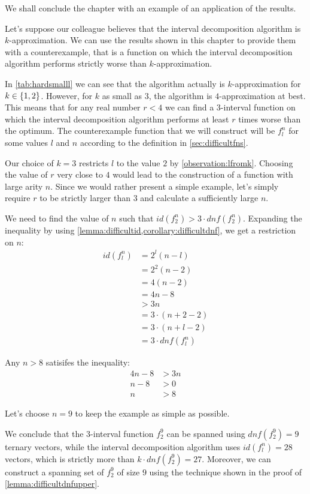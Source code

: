 We shall conclude the chapter with an example
of an application of the results.
\begin{example}
\label{example:approxidf24}
Let's
suppose our colleague believes
that the interval decomposition algorithm
is $k$-approximation.
We can use the results shown in this chapter
to provide them with a counterexample,
that is a function on which
the interval decomposition algorithm
performs strictly worse than $k$-approximation.

In \cref{tab:hardsmalll} we can see that the algorithm
actually is $k$-approximation for $k \in \{1, 2\}$.
However, for $k$ as small as $3$,
the algorithm is $4$-approximation at best.
This means that for any real number $r < 4$
we can find a $3$-interval function on which
the interval decomposition algorithm
performs at least $r$ times worse than the optimum.
The counterexample function that we will construct
will be $f_l^n$ for some values $l$ and $n$
according to the definition in \cref{sec:difficultfns}.

Our choice of $k=3$ restricts $l$ to the value $2$
by \cref{observation:lfromk}.
Choosing the value of $r$ very close to $4$
would lead to the construction of a function
with large arity $n$.
Since we would rather present a simple example,
let's
simply require $r$ to be strictly larger than $3$
and calculate a sufficiently large $n$.

We need to find the value of $n$ such that
$id(f_2^n) > 3 \cdot dnf(f_2^n)$.
Expanding the inequality by using
\cref{lemma:difficultid,corollary:difficultdnf},
we get a restriction on $n$:
\begin{align*}
id(f_l^n) &= 2^l(n-l) \\
&= 2^2(n-2) \\
&= 4 (n-2) \\
&= 4n - 8 \\
&> 3n \\
&= 3 \cdot (n+2-2) \\
&= 3 \cdot (n+l-2) \\
&= 3 \cdot \mathit{dnf}(f_l^n)
\end{align*}

Any $n > 8$ satisifes the inequality:
\begin{align*}
4n - 8 &> 3n \\
n - 8 &> 0 \\
n &> 8
\end{align*}

Let's choose $n=9$
to keep the example as simple as possible.

We conclude that the $3$-interval function $f_2^9$
can be spanned using
$dnf(f_2^9) = 9$ ternary vectors,
while the interval decomposition algorithm
uses $id(f_l^n) = 28$ vectors,
which is strictly more than $k \cdot dnf(f_2^9) = 27$.
Moreover, we can construct a spanning set of $f_2^9$
of size $9$ using the technique shown
in the proof of \cref{lemma:difficultdnfupper}.
\end{example}
